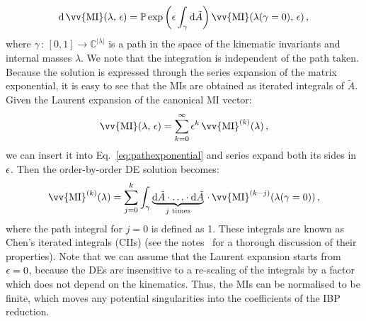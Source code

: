 \documentclass[main.tex]{subfiles}
\begin{document}
\begin{equation} \label{eq:pathexponential}
    \dd \,\vv{\text{MI}}(\lambda,\, \eps) = \mathbb{P} \exp \left(\eps\int_\gamma \dd \tilde{A} \right) \vv{\text{MI}}(\lambda(\gamma=0),\,\eps )\,,
\end{equation}
where $\gamma\,:\,[0, 1] \rightarrow \mathbb{C}^{|\lambda|}$ is a path in the space of the kinematic invariants and internal masses $\lambda$. We note that the integration is independent of the path taken. Because the solution is expressed through the series expansion of the matrix exponential, it is easy to see that the MIs are obtained as iterated integrals of $\tilde{A}$. Given the Laurent expansion of the canonical MI vector:
\begin{equation} \label{eq:MIlaurentexp}
    \vv{\text{MI}}(\lambda, \, \eps) = \sum_{k=0}^\infty \eps^k\,\vv{\text{MI}}^{(k)}(\lambda) \,,
\end{equation}
we can insert it into Eq.~\ref{eq:pathexponential} and series expand both its sides in $\epsilon$. Then the order-by-order DE solution becomes:
\begin{equation} \label{eq:DEssolution}
    \vv{\text{MI}}^{(k)}(\lambda) = \sum_{j=0}^k \int_\gamma \underbrace{\dd \tilde{A} \cdot \ldots \cdot \dd \tilde{A}}_{j\text{ times}} \, \cdot \, \vv{\text{MI}}^{(k-j)}(\lambda(\gamma=0))\,,
\end{equation}
where the path integral for $j=0$ is defined as 1\cite{Chen:1977oja}. These integrals are known as Chen's iterated integrals (CIIs) (see the notes~\cite{Brown:2013qva} for a thorough discussion of their properties). Note that we can assume that the Laurent expansion starts from $\epsilon=0$, because the DEs are insensitive to a re-scaling of the integrals by a factor which does not depend on the kinematics. Thus, the MIs can be normalised to be finite, which moves any potential singularities into the coefficients of the IBP reduction. 
\end{document}
